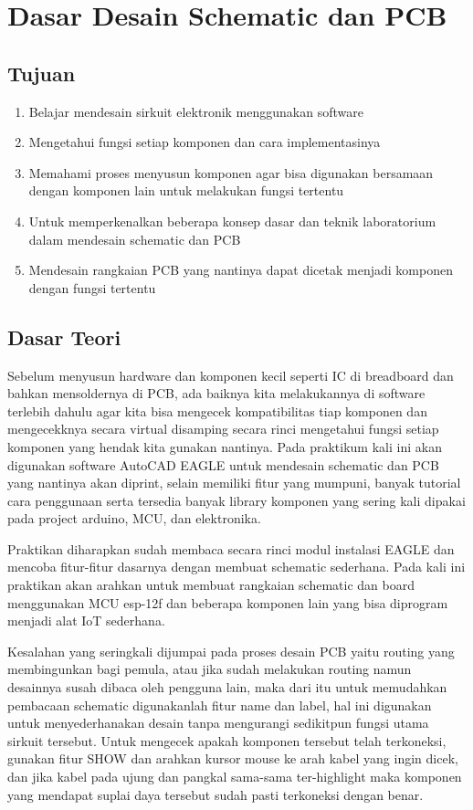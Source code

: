 \chapter{Dasar Desain Schematic dan PCB}

\section{Tujuan}
\begin{enumerate}
    \item Belajar mendesain sirkuit elektronik menggunakan software
    \item Mengetahui fungsi setiap komponen dan cara implementasinya
    \item Memahami proses menyusun komponen agar bisa digunakan bersamaan dengan komponen lain untuk melakukan fungsi tertentu
    \item Untuk memperkenalkan beberapa konsep dasar dan teknik laboratorium dalam mendesain schematic dan PCB
    \item Mendesain rangkaian PCB yang nantinya dapat dicetak menjadi komponen dengan fungsi tertentu
\end{enumerate}


\section{Dasar Teori}
Sebelum menyusun hardware dan komponen kecil seperti IC di breadboard dan
bahkan mensoldernya di PCB, ada baiknya kita melakukannya di software terlebih dahulu agar
kita bisa mengecek kompatibilitas tiap komponen dan mengecekknya secara virtual
disamping secara rinci mengetahui fungsi setiap komponen yang hendak kita gunakan
nantinya. Pada praktikum kali ini akan digunakan software AutoCAD EAGLE untuk mendesain
schematic dan PCB yang nantinya akan diprint, selain memiliki fitur yang mumpuni, banyak
tutorial cara penggunaan serta tersedia banyak library komponen yang sering kali dipakai
pada project arduino, MCU, dan elektronika.

Praktikan diharapkan sudah membaca secara rinci modul instalasi EAGLE dan
mencoba fitur-fitur dasarnya dengan membuat schematic sederhana. Pada kali ini praktikan
akan arahkan untuk membuat rangkaian schematic dan board menggunakan MCU esp-12f
dan beberapa komponen lain yang bisa diprogram menjadi alat IoT sederhana.

Kesalahan yang seringkali dijumpai pada proses desain PCB yaitu routing yang
membingunkan bagi pemula, atau jika sudah melakukan routing namun desainnya susah
dibaca oleh pengguna lain, maka dari itu untuk memudahkan pembacaan schematic
digunakanlah fitur name dan label, hal ini digunakan untuk menyederhanakan desain tanpa
mengurangi sedikitpun fungsi utama sirkuit tersebut. Untuk mengecek apakah komponen
tersebut telah terkoneksi, gunakan fitur SHOW dan arahkan kursor mouse ke arah kabel yang
ingin dicek, dan jika kabel pada ujung dan pangkal sama-sama ter-highlight maka komponen
yang mendapat suplai daya tersebut sudah pasti terkoneksi dengan benar.

